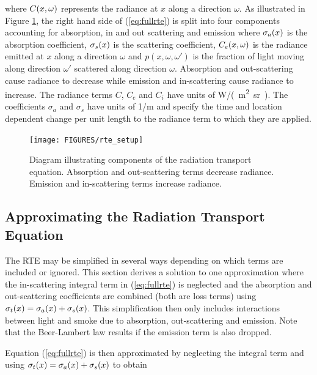 \noindent where  $C(x,\omega)$ represents the  radiance at $x$ along a
direction $\omega$. As illustrated in Figure \ref{figRadiance},
the right hand side of (\ref{eq:fullrte}) is split into four
components accounting for absorption, in and out scattering and
emission where $\sigma_a(x)$ is the absorption coefficient, $\sigma_s(x)$ is
the scattering coefficient, $C_e(x,\omega)$ is the radiance emitted at $x$
along a direction $\omega$ and $p(x,\omega,\omega')$ is the
fraction of light moving along direction $\omega'$ scattered along
direction $\omega$. Absorption and out-scattering cause radiance
to decrease while emission and in-scattering cause radiance to
increase. The radiance terms $C$, $C_e$ and $C_i$ have units of
\si{W/(m^2.sr)}. The coefficients $\sigma_a$ and $\sigma_s$ have
units of \si{1/m} and specify the time and location dependent change
per unit length to the radiance term to which they are applied.

\begin{figure}[\figoptions]
\begin{center}
\texttt{[image: FIGURES/rte\_setup]}
\end{center}
\caption[Diagram illustrating components of the radiation
transport equation]{Diagram illustrating components of the
radiation transport equation.  Absorption and out-scattering terms
decrease radiance.  Emission and in-scattering terms increase
radiance.} \label{figRadiance}
\end{figure}


\subsection{Approximating the Radiation Transport Equation}

The RTE may be simplified in several ways depending on which terms are included or ignored.  This section derives a solution to one approximation where the in-scattering integral term in (\ref{eq:fullrte}) is neglected and the absorption and out-scattering coefficients are combined (both are loss terms) using $\sigma_t(x)=\sigma_a(x)+\sigma_s(x)$.  This simplification then only includes interactions between light and smoke due to absorption,  out-scattering and emission.  Note that the Beer-Lambert law results if the emission term is also dropped.

Equation (\ref{eq:fullrte}) is then approximated by neglecting the integral term and using $\sigma_t(x)=\sigma_a(x)+\sigma_s(x)$ to obtain

